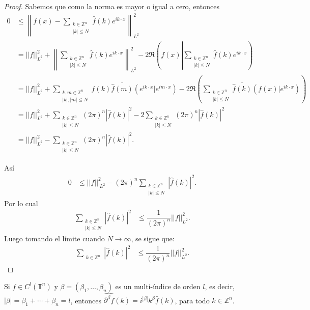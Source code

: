 \documentclass[12pt]{article}
\newcommand\Z{\ensuremath{\mathbb{Z}}}
\begin{document}
\begin{proof}
Sabemos que como la norma es mayor o igual a cero, entonces
\begin{align*}
0 &\leq\left\|f(x)-\sum_{\substack{k\in \Z^{n}\\ |k|\leq N}}\widehat{f}(k)e^{ik\cdot x}\right\|^{2}_{L^2}\\
&= || f||_{L^2}^{2}+ \left\| \sum_{\substack{k\in \Z^{n}\\|k|\leq N}} \widehat{f}(k)e^{ik\cdot x}\right\|_{L^2}^{2}- 2 \Re\left(f(x)\left|\sum_{\substack{k \in \Z^{n}\\ |k|\leq N}} \widehat{f}(k) e^{ik\cdot x}\right.\right)\\
&= || f||_{L^2}^{2}+ \sum_{\substack{k,m\in \Z^{n}\\ |k|,|m|\leq N}} \widehat{f}(k)\overline{\widehat{f}(m)}(e^{ik\cdot x}|e^{im\cdot x})- 2 \Re\left(\sum_{\substack{k \in \Z^{n}\\ |k|\leq N}} \overline{\widehat{f}(k)} \left(f(x) |e^{ik\cdot x}\right)\right)\\
&= || f||_{L^2}^{2}+ \sum_{\substack{k\in \Z^{n}\\ |k|\leq N}} (2\pi)^{n}\left|\widehat{f}(k)\right|^{2}-2 \sum_{\substack{k\in \Z^{n}\\ |k|\leq N}}(2\pi)^n\left|\widehat{f}(k)\right|^{2}\\
&= || f||_{L^2}^{2}- \sum_{\substack{k\in \Z^{n}\\ |k|\leq N}}(2\pi)^n\left|\widehat{f}(k)\right|^{2}.
\end{align*}

Así\begin{align*}
0 &\leq|| f||_{[L^2}^{2}-(2\pi)^n \sum_{\substack{k\in \Z^{n}\\ |k|\leq N}}\left|\widehat{f}(k)\right|^{2}.
\end{align*}
Por lo cual 
\begin{align*}
\sum_{\substack{k\in \Z^{n}\\ |k|\leq N}}\left|\widehat{f}(k)\right|^{2} &\leq\dfrac{1}{(2\pi)^n}|| f||_{L^2}^{2}.
\end{align*}
Luego tomando el límite cuando $N\rightarrow \infty$, se sigue que:
\begin{align*}
\sum_{\substack{k\in \Z^{n}}}\left|\widehat{f}(k)\right|^{2} &\leq\dfrac{1}{(2\pi)^n}|| f||_{L^2}^{2}.
\end{align*}
\end{proof}

\begin{theorem}\label{derivadacacorra}
Si $f \in C^l\left(\mathbb{T}^n\right)$ y $\beta=\left(\beta_1, \ldots, \beta_n\right)$ es un multi-índice de orden $l$, es decir, $|\beta|=\beta_1+\cdots+\beta_n=l$, entonces $\widehat{\partial^\beta f}(k)=i^{|\beta|} k^\beta \widehat{f}(k)$, para todo $k \in \mathbb{Z}^n$.
\end{theorem}
\end{document}
